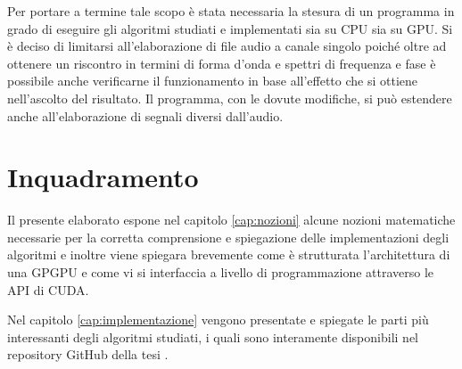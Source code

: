 Per portare a termine tale scopo è stata necessaria la stesura di un programma in grado di eseguire gli algoritmi studiati e implementati sia su CPU sia su GPU. Si è deciso di limitarsi all'elaborazione di file audio a canale singolo poiché oltre ad ottenere un riscontro in termini di forma d'onda e spettri di frequenza e fase è possibile anche verificarne il funzionamento in base all'effetto che si ottiene nell'ascolto del risultato. Il programma, con le dovute modifiche, si può estendere anche all'elaborazione di segnali diversi dall'audio.

\section{Inquadramento}
Il presente elaborato espone nel capitolo \ref{cap:nozioni} alcune nozioni matematiche necessarie per la corretta comprensione e spiegazione delle implementazioni degli algoritmi e inoltre viene spiegara brevemente come è strutturata l'architettura di una GPGPU e come vi si interfaccia a livello di programmazione attraverso le API di CUDA.

Nel capitolo \ref{cap:implementazione} vengono presentate e spiegate le parti più interessanti degli algoritmi studiati, i quali sono interamente disponibili nel repository GitHub della tesi \cite{repo}.